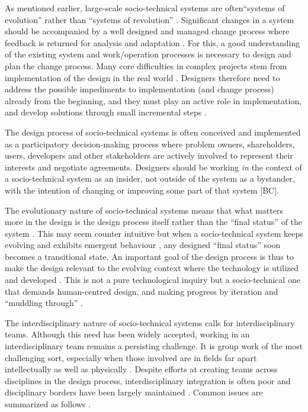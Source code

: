 As mentioned earlier, large-scale socio-technical systems are often``systems of evolution'' rather than ``systems of revolution'' \cite{Baxter2011,Norman2015}. Significant changes in a system should be accompanied by a well designed and managed change process where feedback is returned for analysis and adaptation \cite{Baxter2011}. For this, a good understanding of the existing system and work/operation processes is necessary to design and plan the change process. Many core difficulties in complex projects stem from implementation of the design in the real world \cite{Norman2015}. Designers therefore need to address the possible impediments to implementation (and change process) already from the beginning, and they must play an active role in implementation, and develop solutions through small incremental steps \cite{Norman2015}.

 The design process of socio-technical systems is often conceived and implemented as a participatory decision-making process where problem owners, shareholders, users, developers and other stakeholders are actively involved to represent their interests and negotiate agreements. 
Designers should be working \textit{in} the context of a socio-technical system as an insider, not outside of the system as a bystander, with the intention of changing or improving some part of that system [BC]. 

The evolutionary nature of socio-technical systems means that what matters more in the design is the design process itself rather than the ``final status'' of the system \cite{Shin2014}. This may seem counter intuitive but when a socio-technical system keeps evolving and exhibits emergent behaviour \cite{Nikolic2009}, any designed ``final status'' soon becomes a transitional state. An important goal of the design process is thus to make the design relevant to the evolving context where the technology is utilized and developed \cite{Shin2014}. This is not a pure technological inquiry but a socio-technical one that demands human-centred design, and making progress by iteration and ``muddling through'' \cite{Norman2015}. 

The interdisciplinary nature of socio-technical systems calls for interdisciplinary teams. Although this need has been widely accepted, working in an interdisciplinary team remains a persisting challenge. 
It is group work of the most challenging sort, especially when those involved are in fields far apart intellectually as well as physically \cite{Brewer1999}. 
Despite efforts at creating teams across disciplines in the design process, interdisciplinary integration is often poor and disciplinary borders have been largely maintained \cite{Baxter2011}. Common issues are summarized as follows \cite{Baxter2011,Brewer1999,Norman2015}.

